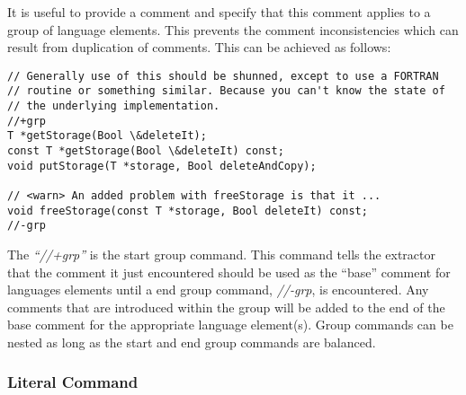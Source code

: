 It is useful to provide a comment and specify that this comment applies to
a group of language elements. This prevents the comment inconsistencies which
can result from duplication of comments. This can be achieved as follows:
\begin{verbatim}
// Generally use of this should be shunned, except to use a FORTRAN 
// routine or something similar. Because you can't know the state of 
// the underlying implementation.
//+grp
T *getStorage(Bool \&deleteIt);
const T *getStorage(Bool \&deleteIt) const;
void putStorage(T *storage, Bool deleteAndCopy);

// <warn> An added problem with freeStorage is that it ...
void freeStorage(const T *storage, Bool deleteIt) const;
//-grp
\end{verbatim}
\noindent
The \emph{``//+grp''} is the start group command. This command tells the 
extractor that the comment it just encountered should be used as the 
``base'' comment for languages elements until a end group command, 
\emph{//-grp}, is encountered. Any comments that are introduced within 
the group will be added to the end of the base comment for the appropriate 
language element(s). Group commands can be nested as long as the start and 
end group commands are balanced.

\subsubsection{Literal Command}

